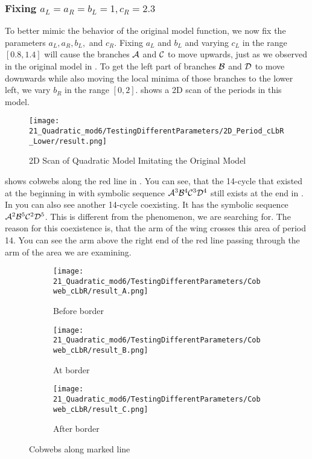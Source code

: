 \subsubsection{Fixing $a_L = a_R = b_L = 1, c_R = 2.3$}

To better mimic the behavior of the original model function, we now fix the parameters $a_L, a_R, b_L,$ and $c_R$.
Fixing $a_L$ and $b_L$ and varying $c_L$ in the range $[0.8, 1.4]$ will cause the branches $\mathcal{A}$ and $\mathcal{C}$ to move upwards, just as we observed in the original model in .
To get the left part of branches $\mathcal{B}$ and $\mathcal{D}$ to move downwards while also moving the local minima of those branches to the lower left, we vary $b_R$ in the range $[0, 2]$.
 shows a 2D scan of the periods in this model.


\begin{figure}
    \centering
    \texttt{[image: 21\_Quadratic\_mod6/TestingDifferentParameters/2D\_Period\_cLbR\_Lower/result.png]}
    \caption{2D Scan of Quadratic Model Imitating the Original Model}
    \label{fig:quadratic.full.cLbR.2d.full}
\end{figure}

 shows cobwebs along the red line in .
You can see, that the 14-cycle that existed at the beginning in  with symbolic sequence $\mathcal{A}^3\mathcal{B}^4\mathcal{C}^3\mathcal{D}^4$ still exists at the end in .
In  you can also see another 14-cycle coexisting.
It has the symbolic sequence $\mathcal{A}^2\mathcal{B}^5\mathcal{C}^2\mathcal{D}^5$.
This is different from the phenomenon, we are searching for.
The reason for this coexistence is, that the arm of the wing crosses this area of period 14.
You can see the arm above the right end of the red line passing through the arm of the area we are examining.

\begin{figure}
    \centering
    \begin{subfigure}{0.3\textwidth}
        \centering
        \texttt{[image: 21\_Quadratic\_mod6/TestingDifferentParameters/Cobweb\_cLbR/result\_A.png]}
        \caption{Before border}
        \label{fig:quad.full.cLbR.CobwebA}
    \end{subfigure}
    \begin{subfigure}{0.3\textwidth}
        \centering
        \texttt{[image: 21\_Quadratic\_mod6/TestingDifferentParameters/Cobweb\_cLbR/result\_B.png]}
        \caption{At border}
        \label{fig:quad.full.cLbR.CobwebB}
    \end{subfigure}
    \begin{subfigure}{0.3\textwidth}
        \centering
        \texttt{[image: 21\_Quadratic\_mod6/TestingDifferentParameters/Cobweb\_cLbR/result\_C.png]}
        \caption{After border}
        \label{fig:quad.full.cLbR.CobwebC}
    \end{subfigure}
    \caption{Cobwebs along marked line}
    \label{fig:quad.full.cLbR.Cobwebs}
\end{figure}

